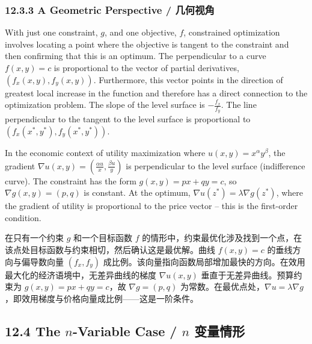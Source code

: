 \subsubsection{12.3.3 A Geometric Perspective / 几何视角}

\begin{original}
With just one constraint, $g$, and one objective, $f$, constrained optimization involves locating a point where the objective is tangent to the constraint and then confirming that this is an optimum. The perpendicular to a curve $f(x, y) = c$ is proportional to the vector of partial derivatives, $(f_x(x, y), f_y(x, y))$. Furthermore, this vector points in the direction of greatest local increase in the function and therefore has a direct connection to the optimization problem. The slope of the level surface is $-\frac{f_x}{f_y}$. The line perpendicular to the tangent to the level surface is proportional to $(f_x(x^*, y^*), f_y(x^*, y^*))$.

In the economic context of utility maximization where $u(x, y) = x^\alpha y^\beta$, the gradient $\nabla u(x, y) = (\frac{\alpha u}{x}, \frac{\beta u}{y})$ is perpendicular to the level surface (indifference curve). The constraint has the form $g(x, y) = px + qy = c$, so $\nabla g(x, y) = (p, q)$ is constant. At the optimum, $\nabla u(z^*) = \lambda \nabla g(z^*)$, where the gradient of utility is proportional to the price vector -- this is the first-order condition.
\end{original}
\begin{translation}
在只有一个约束 $g$ 和一个目标函数 $f$ 的情形中，约束最优化涉及找到一个点，在该点处目标函数与约束相切，然后确认这是最优解。曲线 $f(x, y) = c$ 的垂线方向与偏导数向量 $(f_x, f_y)$ 成比例。该向量指向函数局部增加最快的方向。在效用最大化的经济语境中，无差异曲线的梯度 $\nabla u(x, y)$ 垂直于无差异曲线。预算约束为 $g(x, y) = px + qy = c$，故 $\nabla g = (p, q)$ 为常数。在最优点处，$\nabla u = \lambda \nabla g$，即效用梯度与价格向量成比例——这是一阶条件。
\end{translation}

\subsection{12.4 The $n$-Variable Case / $n$ 变量情形}

